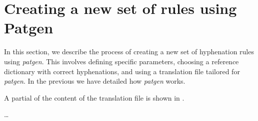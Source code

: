 \section{Creating a new set of rules using Patgen}
In this section, we describe the process of creating a new set of hyphenation rules using \emph{patgen}.
This involves defining specific parameters, choosing a reference dictionary with correct hyphenations, and 
using a translation file tailored for \emph{patgen}. In the previous  we have detailed 
how \emph{patgen} works.

A partial of the content of the translation file is shown in .

\begin{minipage}{\linewidth}

\ldots

\end{minipage}


%
%
%
%


